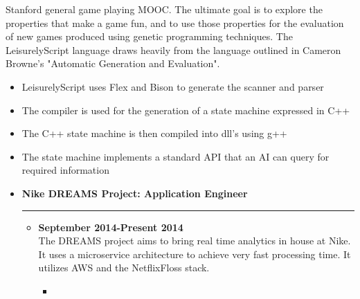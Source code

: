 \documentclass[overlapped]{res}
\begin{document}
\begin{resume}
\begin{itemize}[leftmargin=0in]
\begin{itemize}[leftmargin=0in]
\begin{samepage}
                    Stanford general game playing MOOC. The ultimate goal is to explore the properties that make a game
                    fun, and to use those properties for the evaluation of new games produced using genetic programming techniques. 
                    The LeisurelyScript language draws heavily from the language outlined in Cameron Browne's 
                    "Automatic Generation and Evaluation".
                    \begin{itemize}
                        \item[\textbullet] LeisurelyScript uses Flex and Bison to generate the scanner and parser
                        \item[\textbullet] The compiler is used for the generation of a state machine expressed in C++
                        \item[\textbullet] The C++ state machine is then compiled into dll's using g++
                        \item[\textbullet] The state machine implements a standard API that an AI can query for required information
                    \end{itemize}
                \end{samepage}
        \end{itemize}
\end{itemize}
\vspace{0.25in}

\begin{itemize}[leftmargin=0in]
    \item[] \textbf{Nike DREAMS Project: Application Engineer} \\[-0.1in] \rule{\textwidth}{0.5pt}
        \begin{itemize}[leftmargin=0in]
            \item[] 
                \begin{samepage}
                    \textbf{} \hfill \textbf{September 2014-Present 2014} \\
                    The DREAMS project aims to bring real time analytics in house at Nike. It uses a microservice architecture to achieve very fast processing time. It utilizes AWS and the NetflixFloss stack.
                    \begin{itemize} I am owner of DreamWalker, a microservice that rapidly streams data out of S3 and directly into kafka.
                        \item[\textbullet] 
                    \end{itemize}
                \end{samepage}
        \end{itemize}
\end{itemize}
\vspace{0.25in}


\end{resume}
\end{document}
